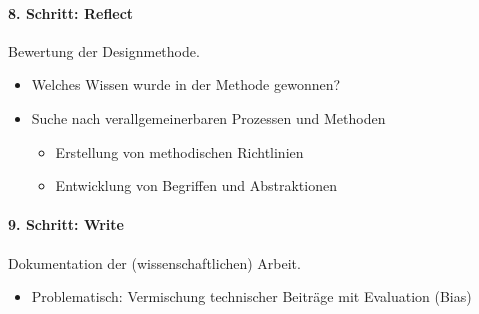 	\paragraph{8. Schritt: Reflect}
		Bewertung der Designmethode.
		\begin{itemize}
			\item Welches Wissen wurde in der Methode gewonnen?
			\item Suche nach verallgemeinerbaren Prozessen und Methoden
				\begin{itemize}
					\item Erstellung von methodischen Richtlinien
					\item Entwicklung von Begriffen und Abstraktionen
				\end{itemize}
		\end{itemize}

		\paragraph{9. Schritt: Write}
			Dokumentation der (wissenschaftlichen) Arbeit.
			\begin{itemize}
				\item Problematisch: Vermischung technischer Beiträge mit Evaluation (Bias)
			\end{itemize}
